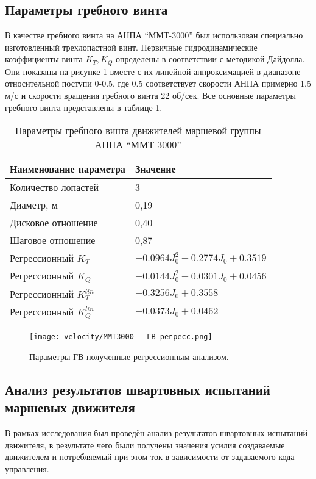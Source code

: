 \subsection{Параметры гребного винта}
В качестве гребного винта на АНПА ``ММТ-3000'' был использован специально изготовленный трехлопастной винт.
Первичные гидродинамические коэффициенты винта $K_T, K_Q$ определены в соответствии с методикой Дайдолла.
Они показаны на рисунке \ref{fig:mmt3000_propeller} вместе с их линейной аппроксимацией в диапазоне относительной поступи 0-0.5, где 0.5 соответствует скорости АНПА примерно 1,5 м/с и скорости вращения гребного винта 22 об/сек.
Все основные параметры гребного винта представлены в таблице \ref{tab:mmt3000_propeller}.

\begin{table}
    \caption{Параметры гребного винта движителей маршевой группы АНПА ``ММТ-3000''
    }
    \label{tab:mmt3000_propeller}
    \centering
    \begin{tabular}{ll}
        \toprule
        Наименование параметра  & Значение\\
        \midrule
        Количество лопастей & 3 \\
        Диаметр, м & 0,19 \\
        Дисковое отношение & 0,40 \\
        Шаговое отношение & 0,87 \\
        Регрессионный $K_T$ & $-0.0964J_0^2 -0.2774J_0 + 0.3519$ \\
        Регрессионный $K_Q$ & $-0.0144J_0^2 -0.0301J_0 + 0.0456$ \\
        Регрессионный $K_T^{lin}$ & $-0.3256J_0 + 0.3558$ \\
        Регрессионный $K_Q^{lin}$ & $-0.0373J_0 + 0.0462$ \\
        \bottomrule
    \end{tabular}
\end{table}

\begin{figure}[ht]
    \centering
    \texttt{[image: velocity/MMT3000 - ГВ регресс.png]}
    \caption{Параметры ГВ полученные регрессионным анализом.}
    \label{fig:mmt3000_propeller}
\end{figure}

\subsection{Анализ результатов швартовных испытаний маршевых движителя}
В рамках исследования был проведён анализ результатов швартовных испытаний движителя, в результате чего были получены значения усилия создаваемые движителем и потребляемый при этом ток в зависимости от задаваемого кода управления.

